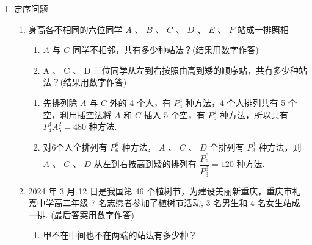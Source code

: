 \begin{enumerate}
\begin{enumerate}
\begin{jieda}
\begin{enumerate}
                \item 方法一:共有 6 个位置，因为甲不坐在两端，所以甲有 4 种坐法，
                
                当甲确定时，要求乙和丙相邻，共有 3 种可能，
                
                所以不同排列方式共有 $4P_{2}^{2} \times  3 \times  P_{3}^{3} = 4 \times  2 \times  3 \times  6 = {144}$ 种.
                
                方法二: 第一步乙、丙相邻共有 $P_{2}^{2}$ 种方法,第二步乙、丙与余下的三人全排列共有 $P_{4}^{4}$ 种方法,第三步把甲插入到中间的 3 个空挡，有 $P_{3}^{1}$ 种方法，故共有 $P_{2}^{2}P_{4}^{4}P_{3}^{1} = {144}$ 种不同的坐法.
            \end{enumerate}
        \end{jieda}

    \end{enumerate}
    
    \item 定序问题
    \begin{enumerate}
        \item 身高各不相同的六位同学 $A$ 、 $B$ 、 $C$ 、 $D$ 、 $E$ 、 $F$ 站成一排照相
        \begin{enumerate}
            \item $A$ 与 $C$ 同学不相邻，共有多少种站法？(结果用数字作答)
            \item A 、 C 、 D 三位同学从左到右按照由高到矮的顺序站，共有多少种站法？(结果用数字作答)
        \end{enumerate}
        \begin{jieda}
            \begin{enumerate}
                \item 先排列除 $A$ 与 $C$ 外的 4 个人，有 $P_{4}^{4}$ 种方法，4 个人排列共有 5 个空，利用插空法将 $A$ 和 $C$ 插入 5 个空，有 $P_{5}^{2}$ 种方法，所以共有 $P_{4}^{4}{A}_{5}^{2} = {480}$ 种方法.
                
                \item 对6个人全排列有 $P_{6}^{6}$ 种方法， $A$ 、 $C$ 、 $D$ 全排列有 $P_{3}^{3}$ 种方法，则 $A\text{ 、 }C\text{ 、 }D$ 从左到右按高到矮的排列有 $\dfrac{P_{6}^{6}}{P_{3}^{3}} = {120}$ 种方法.
            \end{enumerate}
        \end{jieda}
        
        \item 2024 年 3 月 12 日是我国第 46 个植树节，为建设美丽新重庆，重庆市礼嘉中学高二年级 7 名志愿者参加了植树节活动, 3 名男生和 4 名女生站成一排. (最后答案用数字作答) 
        \begin{enumerate}
            \item 甲不在中间也不在两端的站法有多少种？
            

\end{enumerate}
\end{enumerate}
\end{enumerate}
